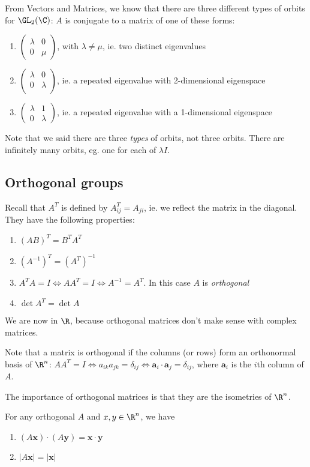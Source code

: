 \documentclass[a4paper]{article}
\begin{document}
From Vectors and Matrices, we know that there are three different types of orbits for $\GL_2(\C)$: $A$ is conjugate to a matrix of one of these forms:
\begin{enumerate}
  \item $
    \begin{pmatrix}
      \lambda & 0\\
      0 & \mu
    \end{pmatrix}
    $, with $\lambda \not= \mu$, ie. two distinct eigenvalues
  \item $
    \begin{pmatrix}
      \lambda & 0\\
      0 & \lambda\\
    \end{pmatrix}$, ie. a repeated eigenvalue with 2-dimensional eigenspace
  \item $
    \begin{pmatrix}
      \lambda & 1\\
      0 & \lambda
    \end{pmatrix}$, ie. a repeated eigenvalue with a 1-dimensional eigenspace
\end{enumerate}
Note that we said there are three \emph{types} of orbits, not three orbits. There are infinitely many orbits, eg. one for each of $\lambda I$.
\subsection{Orthogonal groups}
Recall that $A^T$ is defined by $A^{T}_{ij} = A_{ji}$, ie. we reflect the matrix in the diagonal. They have the following properties:
\begin{enumerate}
  \item $(AB)^T = B^TA^T$
  \item $(A^{-1})^T = (A^T)^{-1}$
  \item $A^{T}A = I\Leftrightarrow AA^{T} = I\Leftrightarrow A^{-1} = A^{T}$. In this case $A$ is \emph{orthogonal}
  \item $\det A^{T} = \det A$
\end{enumerate}
We are now in $\R$, because orthogonal matrices don't make sense with complex matrices.

Note that a matrix is orthogonal if the columns (or rows) form an orthonormal basis of $\R^n$: $AA^T = I\Leftrightarrow a_{ik}a_{jk} = \delta_{ij} \Leftrightarrow \mathbf{a}_i\cdot \mathbf{a}_j = \delta_{ij}$, where $\mathbf{a}_i$ is the $i$th column of $A$.

The importance of orthogonal matrices is that they are the isometries of $\R^n$.
\begin{lemma} For any orthogonal $A$ and $x, y\in \R^n$, we have
  \begin{enumerate}
    \item $(A\mathbf{x})\cdot (A\mathbf{y}) = \mathbf{x\cdot y}$
    \item $|A\mathbf{x}| = |\mathbf{x}|$
  \end{enumerate}
\end{lemma}
\end{document}
